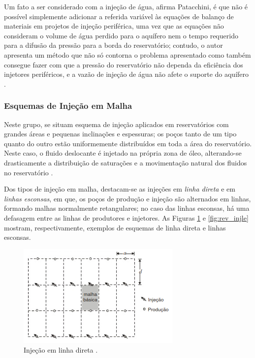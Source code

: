 Um fato a ser considerado com a inje\c{c}\~{a}o de \'{a}gua, afirma Patacchini, \'{e} que n\~{a}o \'{e} poss\'{i}vel simplemente adicionar a referida vari\'{a}vel \`{a}s equa\c{c}\~{o}es de balan\c{c}o de materiais em projetos de inje\c{c}\~{a}o perif\'{e}rica, uma vez que as equa\c{c}\~{o}es n\~{a}o consideram o volume de \'{a}gua perdido para o aqu\'{i}fero nem o tempo requerido para a difus\~{a}o da press\~{a}o para a borda do reservat\'{o}rio; contudo, o autor apresenta um m\'{e}todo que n\~{a}o s\'{o} contorna o problema apresentado como tamb\'{e}m consegue fazer com que a press\~{a}o do reservat\'{o}rio n\~{a}o dependa da efici\^{e}ncia dos injetores perif\'{e}ricos, e a vaz\~{a}o de inje\c{c}\~{a}o de \'{a}gua n\~{a}o afete o suporte do aqu\'{i}fero \cite{PATACCHINI2017720}.

\subsubsection{Esquemas de Inje\c{c}\~{a}o em Malha}
Neste grupo, se situam esquema de inje\c{c}\~{a}o aplicados em reservat\'{o}rios com grandes \'{a}reas e pequenas inclina\c{c}\~{o}es e espessuras; os po\c{c}os tanto de um tipo quanto do outro est\~{a}o uniformemente distribu\'{i}dos em toda a \'{a}rea do reservat\'{o}rio. Neste caso, o fluido deslocante \'{e} injetado na pr\'{o}pria zona de \'{o}leo, alterando-se drasticamente a distribui\c{c}\~{a}o de satura\c{c}\~{o}es e a movimenta\c{c}\~{a}o natural dos fluidos no reservat\'{o}rio \cite[p. 567]{engres}.

Dos tipos de inje\c{c}\~{a}o em malha, destacam-se as inje\c{c}\~{o}es em \textit{linha direta} e em \textit{linhas esconsas}, em que, os po\c{c}os de produ\c{c}\~{a}o e inje\c{c}\~{a}o s\~{a}o alternados em linhas, formando malhas normalmente retangulares; no caso das linhas esconsas, h\'{a} uma defasagem entre as linhas de produtores e injetores. As Figuras \ref{fig:rev_injld} e \ref{fig:rev_injle} mostram, respectivamente, exemplos de esquemas de linha direta e linhas esconsas.

\begin{figure}[!ht]
\centering
\includegraphics[width=.6\textwidth]{figs/revisao/revisao_injld.png}
\caption{Inje\c{c}\~{a}o em linha direta \cite[p. 567]{engres}.}
\label{fig:rev_injld}
\end{figure}

